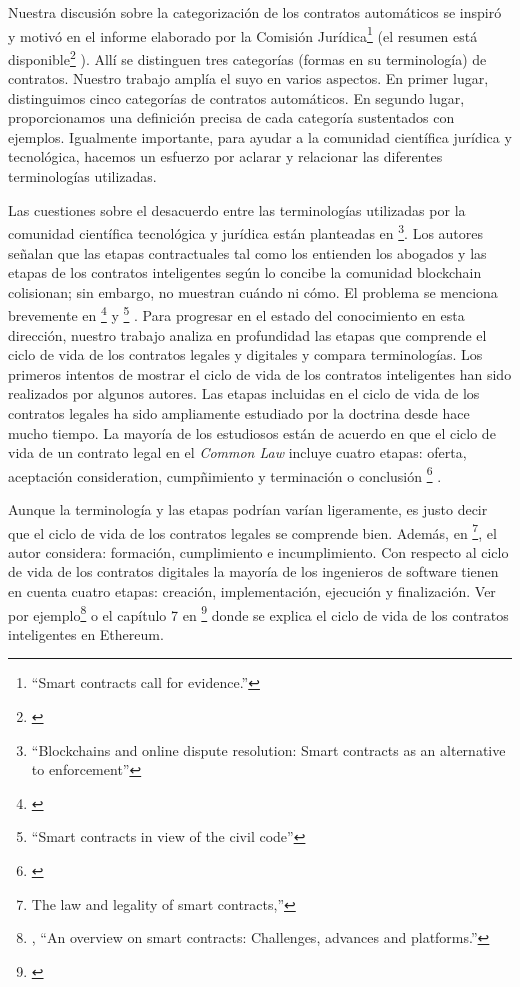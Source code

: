 \documentclass[12pt]{report} %
\begin{document}
Nuestra discusión sobre la categorización de los contratos automáticos se inspiró y motivó en el informe elaborado por la Comisión Jurídica\footnote{\cite{LawCommission2020}“Smart contracts call for evidence.” }  (el resumen está disponible\footnote{\cite{LawCommission2020}} ). Allí se distinguen tres categorías (formas en su terminología) de contratos. Nuestro trabajo amplía el suyo en varios aspectos. En primer lugar, distinguimos cinco categorías de contratos automáticos. En segundo lugar, proporcionamos una definición precisa de cada categoría sustentados con ejemplos. Igualmente importante, para ayudar a la comunidad científica jurídica  y tecnológica, hacemos un esfuerzo por aclarar y relacionar las diferentes terminologías utilizadas.

Las cuestiones sobre el desacuerdo entre las terminologías utilizadas por la comunidad científica tecnológica y jurídica están planteadas en \footnote{\cite{Riikka2016} “Blockchains and online dispute resolution: Smart contracts as an alternative to enforcement”}. Los autores señalan que las etapas contractuales tal como los entienden los abogados y las etapas de los contratos inteligentes según lo concibe la comunidad blockchain colisionan; sin embargo, no muestran cuándo ni cómo. El problema se menciona brevemente en \footnote{\cite{Christopher2019}} y \footnote{\cite{Monika2019}“Smart contracts in view of the civil code”} . Para progresar en el estado del conocimiento en esta dirección, nuestro trabajo analiza en profundidad las etapas que comprende el ciclo de vida de los contratos legales y digitales y compara terminologías. Los primeros intentos de mostrar  el ciclo de vida de los contratos inteligentes han sido realizados por algunos autores. Las etapas incluidas en el ciclo de vida de los contratos legales ha sido ampliamente estudiado por la doctrina desde hace mucho tiempo. La mayoría de los estudiosos están de acuerdo en que el ciclo de vida de un contrato legal en el \textit{Common Law} incluye cuatro etapas: oferta, aceptación consideration, cumpñimiento y terminación o conclusión \footnote{\cite{SEP2015}} . 

Aunque la terminología y las etapas podrían varían ligeramente, es justo decir que el ciclo de vida de los contratos legales se comprende bien. Además, en  \footnote{\cite{MaxRaskin2017}The law and legality of smart contracts,” }, el autor considera: formación, cumplimiento e incumplimiento. Con respecto al ciclo de vida de los contratos digitales la mayoría de los ingenieros de software tienen en cuenta cuatro etapas: creación, implementación, ejecución y finalización. Ver por ejemplo\footnote{\cite{Zibin2019} , “An overview on smart contracts: Challenges, advances and platforms.” }  o el capítulo 7 en \footnote{\cite{AndreasAntonopoulos2018}} donde se explica el ciclo de vida de los contratos inteligentes en Ethereum.
\end{document}
